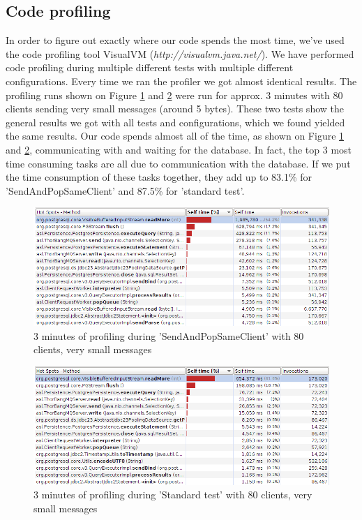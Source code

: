 \documentclass{article}
\begin{document}
        \subsection{Code profiling}
            In order to figure out exactly where our code spends the most time, we've used the code profiling tool VisualVM (\textit{http://visualvm.java.net/}). We have performed code profiling during multiple different tests with multiple different configurations. Every time we ran the profiler we got almost identical results. The profiling runs shown on Figure \ref{fig:code_profiling_send_pop_same_client} and \ref{fig:code_profiling_standard_test} were run for approx. 3 minutes with 80 clients sending very small messages (around 5 bytes). These two tests show the general results we got with all tests and configurations, which we found yielded the same results.  Our code spends almost all of the time, as shown on Figure \ref{fig:code_profiling_send_pop_same_client} and \ref{fig:code_profiling_standard_test}, communicating with and waiting for the database. In fact, the top 3 most time consuming tasks are all due to communication with the database. If we put the time consumption of these tasks together, they add up to 83.1\% for 'SendAndPopSameClient' and 87.5\% for 'standard test'.
            \begin{figure}[H]
                \hspace{-1.5cm}
                \includegraphics[scale=0.50]{code_profiling_send_pop_same_client}
                \caption{3 minutes of profiling during 'SendAndPopSameClient' with 80 clients, very small messages}
                \label{fig:code_profiling_send_pop_same_client}
            \end{figure}
            \begin{figure}[H]
                \hspace{-1.5cm}
                \includegraphics[scale=0.50]{code_profiling_standard_test}
                \caption{3 minutes of profiling during 'Standard test' with 80 clients, very small messages}
                \label{fig:code_profiling_standard_test}
            \end{figure}
\end{document}
